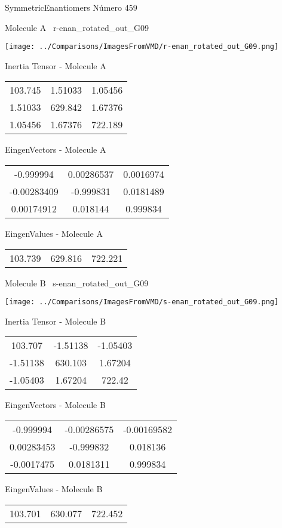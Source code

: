 \vtab[-3cm]
\begin{center}
{\large SymmetricEnantiomers \tab Número 459}
\end{center}
\begin{multicols}{2}
\begin{center}

Molecule A \
r-enan\_rotated\_out\_G09

\texttt{[image: ../Comparisons/ImagesFromVMD/r-enan\_rotated\_out\_G09.png]}

Inertia Tensor - Molecule A \\
\begin{tabular}{|c c c|}
103.745	 & 	1.51033	 & 	1.05456	 \\
1.51033	 & 	629.842	 & 	1.67376	 \\
1.05456	 & 	1.67376	 & 	722.189
\end{tabular}

\vtab
 EingenVectors - Molecule A     \\
\begin{tabular}{|c c c|}
-0.999994	 & 	0.00286537	 & 	0.0016974	 \\
-0.00283409	 & 	-0.999831	 & 	0.0181489	 \\
0.00174912	 & 	0.018144	 & 	0.999834
\end{tabular}

\vtab
 EingenValues - Molecule A     \\
\begin{tabular}{|c c c|}
103.739	 & 	629.816	 & 	722.221	 \\
\end{tabular}
\columnbreak

Molecule B \
s-enan\_rotated\_out\_G09

\texttt{[image: ../Comparisons/ImagesFromVMD/s-enan\_rotated\_out\_G09.png]}

Inertia Tensor - Molecule B \\
\begin{tabular}{|c c c|}
103.707	 & 	-1.51138	 & 	-1.05403	 \\
-1.51138	 & 	630.103	 & 	1.67204	 \\
-1.05403	 & 	1.67204	 & 	722.42
\end{tabular}

\vtab
 EingenVectors - Molecule B     \\
\begin{tabular}{|c c c|}
-0.999994	 & 	-0.00286575	 & 	-0.00169582	 \\
0.00283453	 & 	-0.999832	 & 	0.018136	 \\
-0.0017475	 & 	0.0181311	 & 	0.999834
\end{tabular}

\vtab
 EingenValues - Molecule B     \\
\begin{tabular}{|c c c|}
103.701	 & 	630.077	 & 	722.452	 \\
\end{tabular}

\end{center}
\end{multicols}

